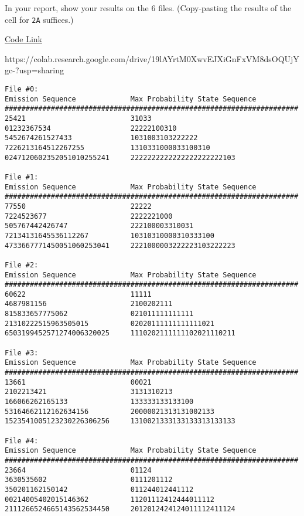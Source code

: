 In your report, show your results on the 6 files. (Copy-pasting the results of the cell for \texttt{2A} suffices.)
\begin{solution}
  \href{https://colab.research.google.com/drive/19lAYrtM0XwvEJXiGnFxVM8dsOQUjYgc-?usp=sharing}{Code Link}

  https://colab.research.google.com/drive/19lAYrtM0XwvEJXiGnFxVM8dsOQUjYgc-?usp=sharing

\begin{verbatim}
File #0:
Emission Sequence             Max Probability State Sequence
######################################################################
25421                         31033                         
01232367534                   22222100310                   
5452674261527433              1031003103222222              
7226213164512267255           1310331000033100310           
0247120602352051010255241     2222222222222222222222103     

File #1:
Emission Sequence             Max Probability State Sequence
######################################################################
77550                         22222                         
7224523677                    2222221000                    
505767442426747               222100003310031               
72134131645536112267          10310310000310333100          
4733667771450051060253041     2221000003222223103222223     

File #2:
Emission Sequence             Max Probability State Sequence
######################################################################
60622                         11111                         
4687981156                    2100202111                    
815833657775062               021011111111111               
21310222515963505015          02020111111111111021          
6503199452571274006320025     1110202111111102021110211     

File #3:
Emission Sequence             Max Probability State Sequence
######################################################################
13661                         00021                         
2102213421                    3131310213                    
166066262165133               133333133133100               
53164662112162634156          20000021313131002133          
1523541005123230226306256     1310021333133133313133133     

File #4:
Emission Sequence             Max Probability State Sequence
######################################################################
23664                         01124                         
3630535602                    0111201112                    
350201162150142               011244012441112               
00214005402015146362          11201112412444011112          
2111266524665143562534450     2012012424124011112411124     


\end{verbatim}
\end{solution}
